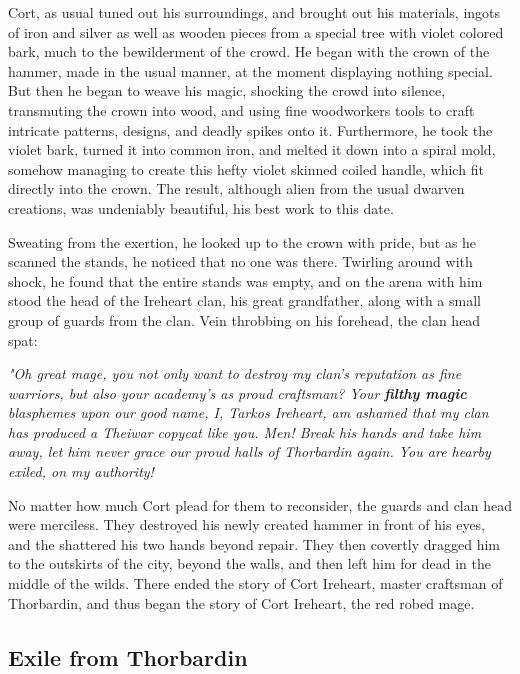 \documentclass[12pt]{article}
\begin{document}
Cort, as usual tuned out his surroundings, and brought out his materials, ingots
of iron and silver as well as wooden pieces from a special tree with violet
colored bark, much to the bewilderment of the crowd. He began with the crown of
the hammer, made in the usual manner, at the moment displaying nothing special.
But then he began to weave his magic, shocking the crowd into silence,
transmuting the crown into wood, and using fine woodworkers tools to craft
intricate patterns, designs, and deadly spikes onto it. Furthermore, he took the
violet bark, turned it into common iron, and melted it down into a spiral mold,
somehow managing to create this hefty violet skinned coiled handle, which fit
directly into the crown. The result, although alien from the usual dwarven
creations, was undeniably beautiful, his best work to this date.

Sweating from the exertion, he looked up to the crown with pride, but as he
scanned the stands, he noticed that no one was there. Twirling around with
shock, he found that the entire stands was empty, and on the arena with him
stood the head of the Ireheart clan, his great grandfather, along with a small
group of guards from the clan. Vein throbbing on his forehead, the clan head
spat:

\begin{quoting}
  \textit{"Oh great mage, you not only want to destroy my clan's reputation as
  fine warriors, but also your academy's as proud craftsman? Your \textbf{filthy
  magic} blasphemes upon our good name, I, Tarkos Ireheart, am ashamed that my
  clan has produced a Theiwar copycat like you. Men! Break his hands and take
  him away, let him never grace our proud halls of Thorbardin again. You are
  hearby exiled, on my authority!}
\end{quoting}

No matter how much Cort plead for them to reconsider, the guards and clan head
were merciless. They destroyed his newly created hammer in front of his eyes, and
the shattered his two hands beyond repair. They then covertly dragged him to the
outskirts of the city, beyond the walls, and then left him for dead in the
middle of the wilds. There ended the story of Cort Ireheart, master craftsman of
Thorbardin, and thus began the story of Cort Ireheart, the red robed mage.

\subsection{Exile from Thorbardin}
\end{document}
